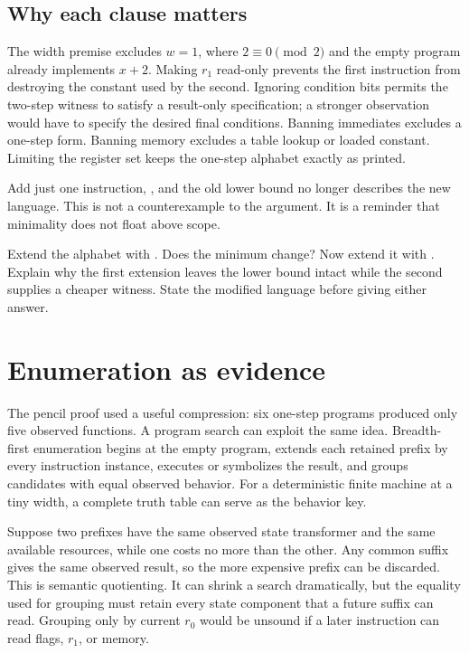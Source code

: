 \subsection{Why each clause matters}

The width premise excludes \(w=1\), where \(2\equiv0\pmod2\) and the empty
program already implements \(x+2\). Making \(r_1\) read-only prevents the
first instruction from destroying the constant used by the second. Ignoring
condition bits permits the two-step witness to satisfy a result-only
specification; a stronger observation would have to specify the desired final
conditions. Banning immediates excludes a one-step  form. Banning
memory excludes a table lookup or loaded constant. Limiting the register set
keeps the one-step alphabet exactly as printed.

Add just one instruction, , and the old lower bound no
longer describes the new language. This is not a counterexample to the
argument. It is a reminder that minimality does not float above scope.

\begin{tryit}[title={Break the claim cleanly}]
Extend the alphabet with . Does the minimum change? Now extend
it with . Explain why the first extension leaves the lower
bound intact while the second supplies a cheaper witness. State the modified
language before giving either answer.
\end{tryit}

\section{Enumeration as evidence}

The pencil proof used a useful compression: six one-step programs produced
only five observed functions. A program search can exploit the same idea.
Breadth-first enumeration begins at the empty program, extends each retained
prefix by every instruction instance, executes or symbolizes the result, and
groups candidates with equal observed behavior. For a deterministic finite
machine at a tiny width, a complete truth table can serve as the behavior key.

Suppose two prefixes have the same observed state transformer and the same
available resources, while one costs no more than the other. Any common
suffix gives the same observed result, so the more expensive prefix can be
discarded. This is semantic quotienting. It can shrink a search dramatically,
but the equality used for grouping must retain every state component that a
future suffix can read. Grouping only by current \(r_0\) would be unsound if a
later instruction can read flags, \(r_1\), or memory.

